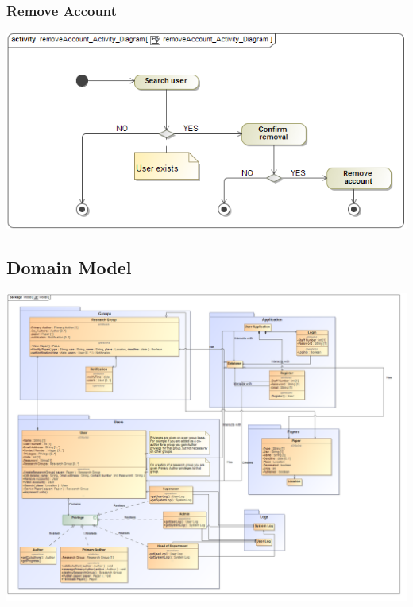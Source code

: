 \documentclass[11pt]{article}
\begin{document}
	\subsubsection{Remove Account}
	\begin{center}
		\includegraphics[width=\textwidth]{../Diagrams/ActivityDiagrams/removeAccount_Activity_Diagram.png}\\[0.5cm]
	\end{center}
	
	\subsection{Domain Model}
	\begin{center}
		\includegraphics[width=\textwidth]{../Diagrams/DomainModel/Model.png}\\[0.5cm]
	\end{center}
	
\end{document}

